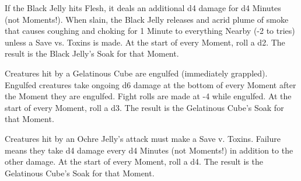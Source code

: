 {


\MONSTERBLOCK[
  Name=Green Slime,
  Link=monster-green-slime,
  MV=n/a,
  WK=d20,
  DMG=d6 1 Close,
  HD=2,
  Power=Average,
  Soak=1,
  Morale=n/a,
  Save=2,
  Extras={Splitting}
]

\MONSTERBLOCK[
  Name=Black Jelly,
  Link=monster-black-jelly,
  MV=n/a,
  WK=d20,
  DMG=2d4 1 Close,
  HD=3,
  Power=Average,
  Soak=varies,
  Morale=n/a,
  Save=2,
  Extras={Acidic}
]

If the Black Jelly hits Flesh, it deals an additional d4 damage for d4 Minutes (not Moments!).  When slain, the Black Jelly releases and acrid plume of smoke that causes coughing and choking for 1 Minute to everything Nearby (-2 to \RO tries) unless a Save vs. Toxins is made.
At the start of every Moment, roll a d2.  The result is the Black Jelly's Soak for that Moment.

\MONSTERBLOCK[
  Name=Gelatinous Cube,
  Link=monster-gelatinous-cube,
  MV=Slow,
  WK=d16,
  DMG=d10 All Close,
  HD=4,
  Power=Average,
  Soak=varies,
  Morale=n/a,
  Save=3,
  Extras={}
]
Creatures hit by a Gelatinous Cube are engulfed (immediately grappled).  Engulfed creatures take ongoing d6 damage at the bottom of every Moment after the Moment they are engulfed.  Fight \RO rolls are made at -4 while engulfed.
At the start of every Moment, roll a d3.  The result is the Gelatinous Cube's Soak for that Moment.

\MONSTERBLOCK[
  Name=Ochre Jelly,
  Link=monster-ochre-jelly,
  MV=n/a,
  WK=d16,
  DMG=d12 3 Nearby,
  HD=5,
  Power=Average,
  Soak=varies,
  Morale=n/a,
  Save=3,
  Extras={}
]
Creatures hit by an Ochre Jelly's attack must make a Save v. Toxins.  Failure means they take d4 damage every d4 Minutes (not Moments!) in addition to the other damage.
At the start of every Moment, roll a d4.  The result is the Gelatinous Cube's Soak for that Moment.

\newpage



\MONSTERBLOCK[
  Name=Ghoul,
  Link=monster-ghoul,
  MV=Fast,
  WK=d20,
  DMG=d6 2 Close,
  HD=2,
  Power=Average,
  Soak=0,
  Morale=Cowardly,
  Save=2,
  Extras={Nocturnal}
]

}
